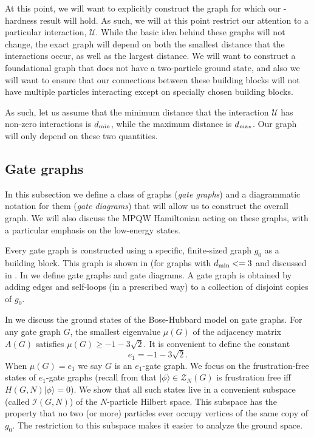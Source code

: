 \documentclass[../thesis-main/thesis-main]{subfiles}
\begin{document}
At this point, we will want to explicitly construct the graph for which our \QMA-hardness result will hold.  As such, we will at this point restrict our attention to a particular interaction, $\mathcal{U}$.  While the basic idea behind these graphs will not change, the exact graph will depend on both the smallest distance that the interactions occur, as well as the largest distance.  We will want to construct a foundational graph that does not have a two-particle ground state, and also we will want to ensure that our connections between these building blocks will not have multiple particles interacting except on specially chosen building blocks.

As such, let us assume that the minimum distance that the interaction $\mathcal{U}$ has non-zero interactions is $d_{\text{min}}$, while the maximum distance is $d_{\text{max}}$.  Our graph will only depend on these two quantities.

\subsection{Gate graphs}

In this subsection we define a class of graphs (\emph{gate graphs}) and a diagrammatic notation for them (\emph{gate diagrams}) that will allow us to construct the overall graph. We will also discuss the MPQW Hamiltonian acting on these graphs, with a particular emphasis on the low-energy states.

Every gate graph is constructed using a specific, finite-sized graph $g_{0}$ as a building block. This graph is shown in  (for graphs with $d_{\text{min}} <= 3$ and discussed in . In  we define gate graphs and gate diagrams. A gate graph is obtained by adding edges and self-loops (in a prescribed way) to a collection of disjoint copies of $g_{0}$.


In  we discuss the ground states of the Bose-Hubbard model on gate graphs. For any gate graph $G$, the smallest eigenvalue $\mu(G)$ of the adjacency matrix $A(G)$ satisfies $\mu(G)\geq-1-3\sqrt{2}$. It is convenient to define the constant
\begin{equation}
e_{1}=-1-3\sqrt{2}.\label{eq:e1_defn}
\end{equation}
When $\mu(G)=e_{1}$ we say $G$ is an $e_{1}$-gate graph. We focus on the frustration-free states of $e_1$-gate graphs (recall from  that $|\phi\rangle\in \mathcal{Z}_N(G)$ is frustration free iff $H(G,N)|\phi\rangle=0$). We show that all such states live in a convenient subspace (called $\mathcal{I}(G,N)$) of the $N$-particle Hilbert space. This subspace has the property that no two (or more) particles ever occupy vertices of the same copy of $g_{0}$. The restriction to this subspace makes it easier to analyze the ground space.
\end{document}
